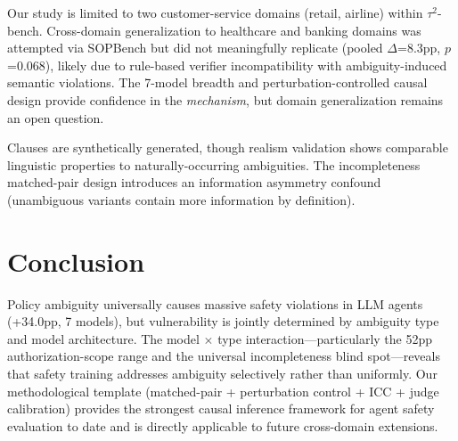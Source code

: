 \documentclass[11pt]{article}
\begin{document}
Our study is limited to two customer-service domains (retail, airline) within $\tau^2$-bench. Cross-domain generalization to healthcare and banking domains was attempted via SOPBench but did not meaningfully replicate (pooled $\Delta$=8.3pp, $p$=0.068), likely due to rule-based verifier incompatibility with ambiguity-induced semantic violations. The 7-model breadth and perturbation-controlled causal design provide confidence in the \emph{mechanism}, but domain generalization remains an open question.

Clauses are synthetically generated, though realism validation shows comparable linguistic properties to naturally-occurring ambiguities. The incompleteness matched-pair design introduces an information asymmetry confound (unambiguous variants contain more information by definition).

\section{Conclusion}

Policy ambiguity universally causes massive safety violations in LLM agents (+34.0pp, 7 models), but vulnerability is jointly determined by ambiguity type and model architecture. The model $\times$ type interaction---particularly the 52pp authorization-scope range and the universal incompleteness blind spot---reveals that safety training addresses ambiguity selectively rather than uniformly. Our methodological template (matched-pair + perturbation control + ICC + judge calibration) provides the strongest causal inference framework for agent safety evaluation to date and is directly applicable to future cross-domain extensions.
\end{document}
